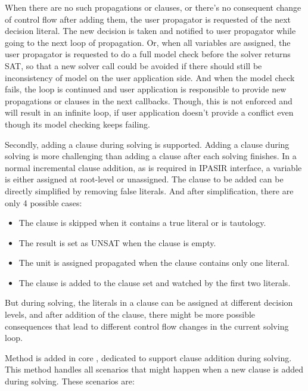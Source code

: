 When there are no such propagations or clauses, or there's no consequent change of control flow after adding them, the user propagator is requested of the next decision literal. The new decision is taken and notified to user propagator while going to the next loop of propagation. Or, when all variables are assigned, the user propagator is requested to do a full model check before the solver returns SAT, so that a new solver call could be avoided if there should still be inconsistency of model on the user application side. And when the model check fails, the loop is continued and user application is responsible to provide new propagations or clauses in the next callbacks. Though, this is not enforced and will result in an infinite loop, if user application doesn't provide a conflict even though its model checking keeps failing.

Secondly, adding a clause during solving is supported. Adding a clause during solving is more challenging than adding a clause after each solving finishes. In a normal incremental clause addition, as is required in IPASIR interface, a variable is either assigned at root-level or unassigned. The clause to be added can be directly simplified by removing false literals. And after simplification, there are only 4 possible cases:

\begin{itemize}
  \item The clause is skipped when it contains a true literal or is tautology.
  \item The result is set as UNSAT when the clause is empty.
  \item The unit is assigned propagated when the clause contains only one literal.
  \item The clause is added to the clause set and watched by the first two literals.
\end{itemize}

But during solving, the literals in a clause can be assigned at different decision levels, and after addition of the clause, there might be more possible consequences that lead to different control flow changes in the current solving loop.

Method  is added in core , dedicated to support clause addition during solving. This method handles all scenarios that might happen when a new clause is added during solving. These scenarios are:

